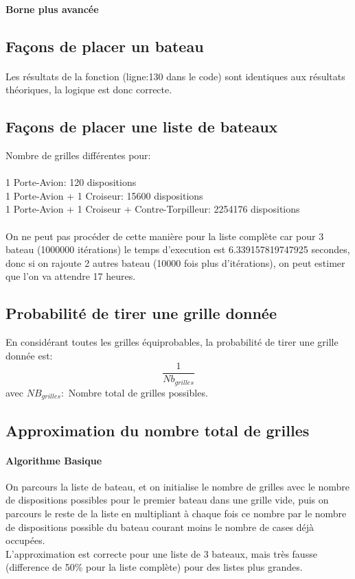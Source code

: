 \documentclass[12pt]{article}
\begin{document}
            \paragraph{Borne plus avancée}
        
        \subsection{Façons de placer un bateau}
            \paragraph{}
                Les résultats de la fonction (ligne:130 dans le code) sont identiques aux résultats théoriques, la logique est donc correcte.
    
        \subsection{Façons de placer une liste de bateaux}
            Nombre de grilles différentes pour:\\\\
                1 Porte-Avion: 120 dispositions \\
                1 Porte-Avion + 1 Croiseur: 15600 dispositions \\
                1 Porte-Avion + 1 Croiseur + Contre-Torpilleur: 2254176 dispositions \\\\
            On ne peut pas procéder de cette manière pour la liste complète car pour 3 bateau (1000000 itérations) le temps d'execution est 6.339157819747925 secondes, donc si on rajoute 2 autres bateau (10000 fois plus d'itérations), on peut estimer que l'on va attendre 17 heures.
            
    \subsection{Probabilité de tirer une grille donnée}
        En considérant toutes les grilles équiprobables, la probabilité de tirer une grille donnée est: $$\frac{1}{Nb_{grilles}}$$ avec $NB_{grilles}:$ Nombre total de grilles possibles.
    \subsection{Approximation du nombre total de grilles}
        \paragraph{Algorithme Basique}
            On parcours la liste de bateau, et on initialise le nombre de grilles avec le nombre de dispositions possibles pour le premier bateau dans une grille vide, puis on parcours le reste de la liste en multipliant à chaque fois ce nombre par le nombre de dispositions possible du bateau courant moins le nombre de cases déjà occupées.\\
            L'approximation est correcte pour une liste de 3 bateaux, mais très fausse (difference de 50\% pour la liste complète) pour des listes plus grandes.
\end{document}
